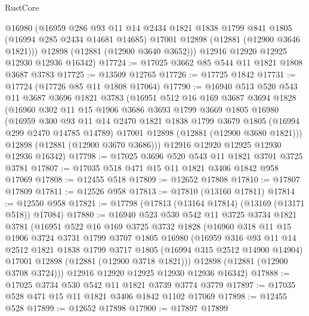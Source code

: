 \begin{lexlean}{RustCore}
\begin{coremodule}
        @16980
        (@16959
          @286
          @93
          @11
          @14
          @2434
          @1821
          @1838
          @1799
          @841
          @1805
          (@16994 @285 @2434 @14681 @14685)
          @17001
          @12898
          (@12881 (@12900 @3646 @1821)))
        @12898
        (@12881 (@12900 @3640 @3652)))
      @12916
      @12920
      @12925
      @12930
      @12936
      @16342)
@17724 := @17025 @3662 @85 @544 @11 @1821 @1808 @3687 @3783
@17725 := @13509 @12765
@17726 := @17725 @1842
@17731 := @17724 (@17726 @85 @11 @1808 @17064)
@17790 := @16940
    @513
    @520
    @543
    @11
    @3687
    @3696
    @1821
    @3783
    (@16951
      @512
      @16
      @169
      @3687
      @3694
      @1828
      (@16960
        @302
        @11
        @15
        @1906
        @3686
        @3693
        @1799
        @3669
        @1805
        @16980
        (@16959
          @300
          @93
          @11
          @14
          @2470
          @1821
          @1838
          @1799
          @3679
          @1805
          (@16994 @299 @2470 @14785 @14789)
          @17001
          @12898
          (@12881 (@12900 @3680 @1821)))
        @12898
        (@12881 (@12900 @3670 @3686)))
      @12916
      @12920
      @12925
      @12930
      @12936
      @16342)
@17798 := @17025 @3696 @520 @543 @11 @1821 @3701 @3725 @3781
@17807 := @17035 @518 @471 @15 @11 @1821 @3406 @1842 @958 @17069
@17808 := @12455 @518
@17809 := @12652 @17808
@17810 := @17807 @17809
@17811 := @12526 @958
@17813 := @17810 (@13160 @17811)
@17814 := @12550 @958
@17821 := @17798 (@17813 (@13164 @17814) (@13169 (@13171 @518)) @17084)
@17880 := @16940
    @523
    @530
    @542
    @11
    @3725
    @3734
    @1821
    @3781
    (@16951
      @522
      @16
      @169
      @3725
      @3732
      @1828
      (@16960
        @318
        @11
        @15
        @1906
        @3724
        @3731
        @1799
        @3707
        @1805
        @16980
        (@16959
          @316
          @93
          @11
          @14
          @2512
          @1821
          @1838
          @1799
          @3717
          @1805
          (@16994 @315 @2512 @14900 @14904)
          @17001
          @12898
          (@12881 (@12900 @3718 @1821)))
        @12898
        (@12881 (@12900 @3708 @3724)))
      @12916
      @12920
      @12925
      @12930
      @12936
      @16342)
@17888 := @17025 @3734 @530 @542 @11 @1821 @3739 @3774 @3779
@17897 := @17035 @528 @471 @15 @11 @1821 @3406 @1842 @1102 @17069
@17898 := @12455 @528
@17899 := @12652 @17898
@17900 := @17897 @17899

\end{coremodule}
\end{lexlean}
